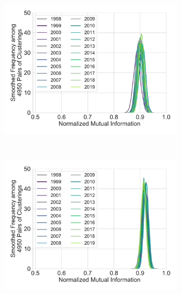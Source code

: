 \documentclass[varwidth, border=0pt]{standalone}
\begin{document}
	
	\begin{figure}
		\centering
		\begin{subfigure}{0.5\linewidth}
			\includegraphics[width=\linewidth]{../../graphics/variance_infomap_runs_us_reg_nmi}
		\end{subfigure}~%
		\begin{subfigure}{0.5\linewidth}
			\includegraphics[width=\linewidth]{../../graphics/variance_infomap_runs_de_reg_nmi}
		\end{subfigure}
		\begin{subfigure}{0.5\linewidth}

\end{subfigure}
\end{figure}
\end{document}
